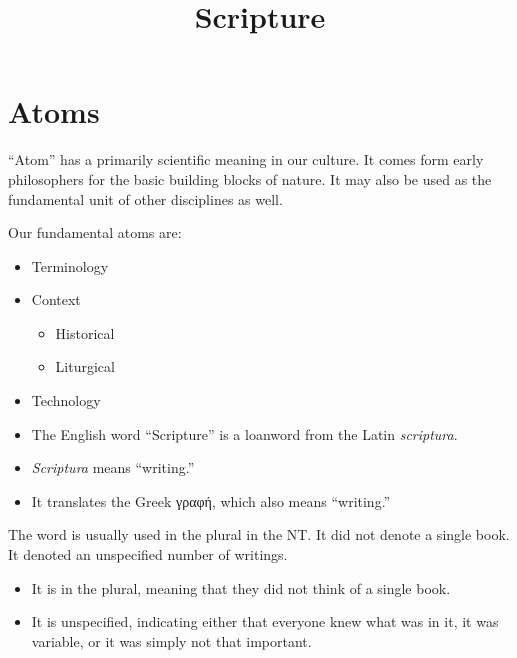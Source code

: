 \documentclass{beamer}
\title{Scripture}
\begin{document}
\maketitle

\section{Atoms}

\begin{frame}
  ``Atom'' has a primarily scientific meaning in our culture.
  It comes form early philosophers for the basic building blocks of nature.
  It may also be used as the fundamental unit of other disciplines as well.
\end{frame}

\begin{frame}
  Our fundamental atoms are:\pause
  \begin{itemize}
	\item Terminology\pause
	\item Context\pause
	  \begin{itemize}
		\item Historical\pause
		\item Liturgical\pause
	  \end{itemize}
	\item Technology
  \end{itemize}
\end{frame}

\begin{frame}
  \begin{itemize}
	\item The English word ``Scripture'' is a loanword from the Latin \emph{scriptura}.\pause
	\item \emph{Scriptura} means ``writing.''\pause
	\item It translates the Greek \textgreek{γραφή}, which also means ``writing.''
  \end{itemize}
\end{frame}

\begin{frame}
  The word is usually used in the plural in the NT.
  It did not denote a single book.
  It denoted an unspecified number of writings.\pause
  \begin{itemize}
	\item It is in the plural, meaning that they did not think of a single book.\pause
	\item It is unspecified, indicating either that everyone knew what was in it, it was variable, or it was simply not that important.
  \end{itemize}
\end{frame}
\end{document}
